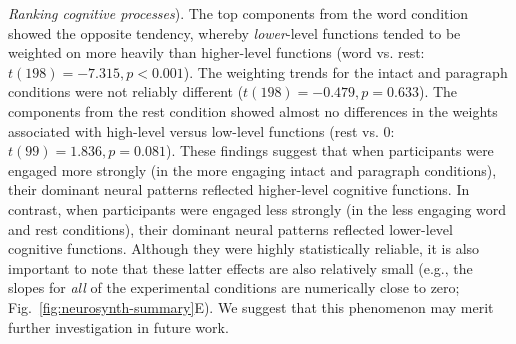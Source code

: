\documentclass[english, 11pt]{article}
\begin{document}
\textit{Ranking cognitive processes}). The top components from the word
condition showed the opposite tendency, whereby \textit{lower}-level functions
tended to be weighted on more heavily than higher-level functions (word vs.
rest: $t(198) = -7.315, p < 0.001$). The weighting trends for the intact and
paragraph conditions were not reliably different ($t(198) = -0.479, p =
0.633$). The components from the rest condition showed almost no differences in
the weights associated with high-level versus low-level functions (rest vs. 0:
$t(99) = 1.836, p = 0.081$). These findings suggest that when participants were
engaged more strongly (in the more engaging intact and paragraph conditions),
their dominant neural patterns reflected higher-level cognitive functions. In
contrast, when participants were engaged less strongly (in the less engaging
word and rest conditions), their dominant neural patterns reflected lower-level
cognitive functions. Although they were highly statistically reliable, it is
also important to note that these latter effects are also relatively small
(e.g., the slopes for \textit{all} of the experimental conditions are
numerically close to zero; Fig.~\ref{fig:neurosynth-summary}E). We suggest that
this phenomenon may merit further investigation in future work.
\end{document}
